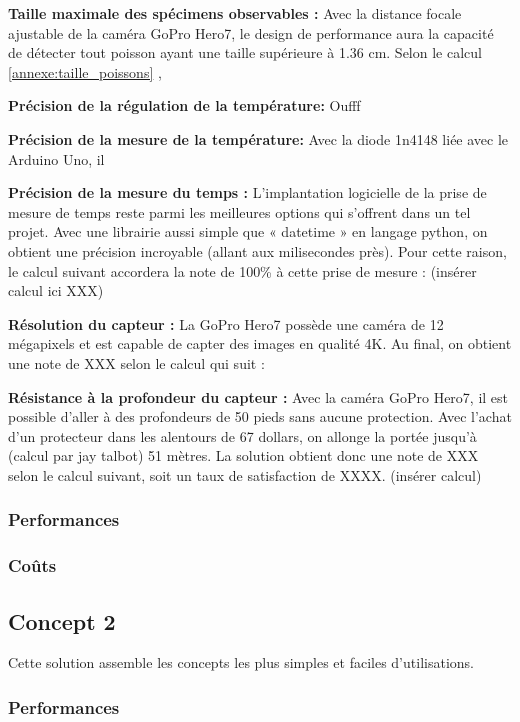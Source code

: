 \textbf{Taille maximale des spécimens observables :}
Avec la distance focale ajustable de la caméra GoPro Hero7, le design de performance aura la capacité de détecter tout poisson ayant une taille supérieure à 1.36 cm. Selon le calcul 
\ref{annexe:taille_poissons} , 


\textbf{Précision de la régulation de la température:}
Oufff

\textbf{Précision de la mesure de la température:}
Avec la diode 1n4148 liée avec le Arduino Uno, il 

\textbf{Précision de la mesure du temps :}
L’implantation logicielle de la prise de mesure de temps reste parmi les meilleures options qui s’offrent dans un tel projet. Avec une librairie aussi simple que « datetime » en langage python, on obtient une précision incroyable (allant aux milisecondes près). Pour cette raison, le calcul suivant accordera la note de 100\% à cette prise de mesure : (insérer calcul ici XXX)

\textbf{Résolution du capteur : }La GoPro Hero7 possède une caméra de 12 mégapixels et est capable de capter des images en qualité 4K. Au final, on obtient une note de XXX selon le calcul qui suit :

\textbf{Résistance à la profondeur du capteur : } Avec la caméra GoPro Hero7, il est possible d’aller à des profondeurs de 50 pieds sans aucune protection. Avec l’achat d’un protecteur dans les alentours de 67 dollars, on allonge la portée jusqu’à (calcul par jay talbot) 51 mètres. La solution obtient donc une note de XXX selon le calcul suivant, soit un taux de satisfaction de XXXX. (insérer calcul)




\subsubsection{Performances}


\subsubsection{Coûts}



\subsection{Concept 2}
Cette solution assemble les concepts les plus simples et faciles d'utilisations.

\subsubsection{Performances}

